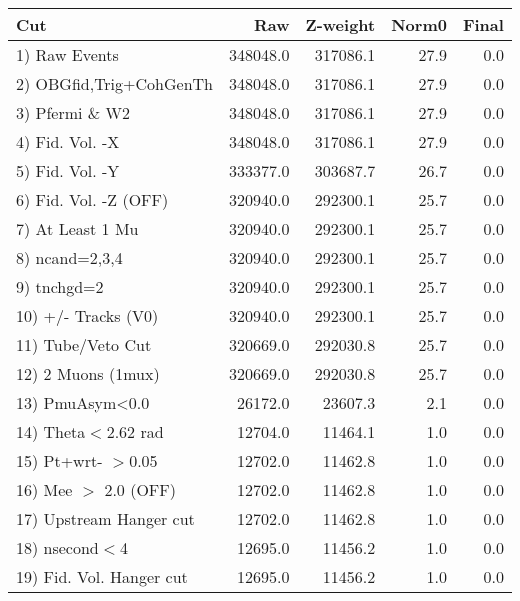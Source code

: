  \begin{table}[h!]\centering
 \begin{tabular}{||l||r|r|r|r||}
 \hline
 \hline
 Cut & Raw & Z-weight & Norm0 & Final \\
 \hline
  1) Raw Events           &    348048.0 &    317086.1 &        27.9 &         0.0 \\
  2) OBGfid,Trig+CohGenTh &    348048.0 &    317086.1 &        27.9 &         0.0 \\
  3) Pfermi \& W2         &    348048.0 &    317086.1 &        27.9 &         0.0 \\
  4) Fid. Vol. -X         &    348048.0 &    317086.1 &        27.9 &         0.0 \\
  5) Fid. Vol. -Y         &    333377.0 &    303687.7 &        26.7 &         0.0 \\
  6) Fid. Vol. -Z (OFF)   &    320940.0 &    292300.1 &        25.7 &         0.0 \\
  7) At Least 1 Mu        &    320940.0 &    292300.1 &        25.7 &         0.0 \\
  8) ncand=2,3,4          &    320940.0 &    292300.1 &        25.7 &         0.0 \\
  9) tnchgd=2             &    320940.0 &    292300.1 &        25.7 &         0.0 \\
 10) +/- Tracks (V0)      &    320940.0 &    292300.1 &        25.7 &         0.0 \\
 11) Tube/Veto Cut        &    320669.0 &    292030.8 &        25.7 &         0.0 \\
 12) 2 Muons (1mux)       &    320669.0 &    292030.8 &        25.7 &         0.0 \\
 13) PmuAsym<0.0          &     26172.0 &     23607.3 &         2.1 &         0.0 \\
 14) Theta$<$2.62 rad     &     12704.0 &     11464.1 &         1.0 &         0.0 \\
 15) Pt+wrt- $>$0.05      &     12702.0 &     11462.8 &         1.0 &         0.0 \\
 16) Mee $>$ 2.0  (OFF)   &     12702.0 &     11462.8 &         1.0 &         0.0 \\
 17) Upstream Hanger cut  &     12702.0 &     11462.8 &         1.0 &         0.0 \\
 18) nsecond$<$4          &     12695.0 &     11456.2 &         1.0 &         0.0 \\
 19) Fid. Vol. Hanger cut &     12695.0 &     11456.2 &         1.0 &         0.0 \\

\end{tabular}
\end{table}
